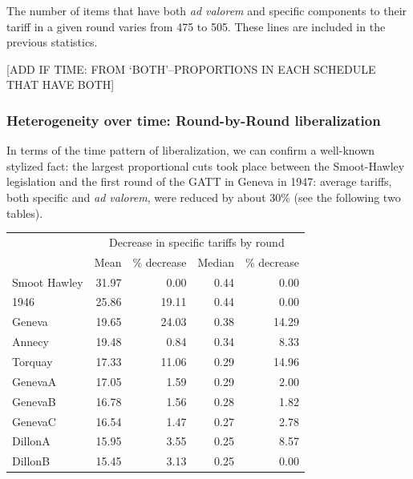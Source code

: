 \documentclass[
  12pt,
]{article}
\begin{document}
The number of items that have both \emph{ad valorem} and specific components to their tariff in a given round varies from 475 to 505. These lines are included in the previous statistics.

{[}ADD IF TIME: FROM `BOTH'--PROPORTIONS IN EACH SCHEDULE THAT HAVE BOTH{]}

\hypertarget{heterogeneity-over-time-round-by-round-liberalization}{%
\subsubsection{Heterogeneity over time: Round-by-Round liberalization}\label{heterogeneity-over-time-round-by-round-liberalization}}

In terms of the time pattern of liberalization, we can confirm a well-known stylized fact: the largest proportional cuts took place between the Smoot-Hawley legislation and the first round of the GATT in Geneva in 1947: average tariffs, both specific and \emph{ad valorem}, were reduced by about 30\% (see the following two tables).

\begin{table}[!h]
\centering
\begin{tabular}[t]{lrrrr}
\toprule
\multicolumn{1}{c}{\bgroup\fontsize{12}{14}\selectfont  \egroup{}} & \multicolumn{4}{c}{\bgroup\fontsize{12}{14}\selectfont Decrease in specific tariffs by round\egroup{}} \\
\cmidrule(l{3pt}r{3pt}){2-5}
  & Mean & \% decrease & Median & \% decrease\\
\midrule
Smoot Hawley & 31.97 & 0.00 & 0.44 & 0.00\\
1946 & 25.86 & 19.11 & 0.44 & 0.00\\
Geneva & 19.65 & 24.03 & 0.38 & 14.29\\
Annecy & 19.48 & 0.84 & 0.34 & 8.33\\
Torquay & 17.33 & 11.06 & 0.29 & 14.96\\
\addlinespace
GenevaA & 17.05 & 1.59 & 0.29 & 2.00\\
GenevaB & 16.78 & 1.56 & 0.28 & 1.82\\
GenevaC & 16.54 & 1.47 & 0.27 & 2.78\\
DillonA & 15.95 & 3.55 & 0.25 & 8.57\\
DillonB & 15.45 & 3.13 & 0.25 & 0.00\\
\bottomrule
\end{tabular}
\end{table}
\end{document}
